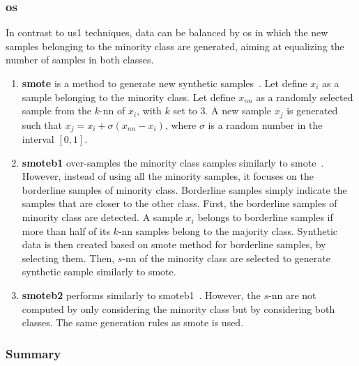 \subsubsection{\Acl*{os}}
In contrast to \ac{us1} techniques, data can be balanced by \ac{os} in which
the new samples belonging to the minority class are generated, aiming at
equalizing the number of samples in both classes.

\begin{enumerate}[leftmargin=*]

\item[] \textbf{\Ac{smote}} is a method to generate new synthetic
  samples~\cite{chawla2002smote}.
  Let define $x_i$ as a sample belonging to the minority class.
  Let define $x_{nn}$ as a randomly selected sample from the $k$-\ac{nn} of
  $x_i$, with $k$ set to 3.
  A new sample $x_j$ is generated such that $x_j = x_i + \sigma \left( x_{nn} -
    x_i \right)$, where $\sigma$ is a random number in the interval
  $\left[0,1\right]$.

\item[] \textbf{\Ac{smoteb1}} over-samples the minority class samples similarly to
  \ac{smote}~\cite{han2005borderline}.
  However, instead of using all the minority samples, it focuses on the
  borderline samples of minority class.
  Borderline samples simply indicate the samples that are closer to the other
  class.
  First, the borderline samples of minority class are detected.
  A sample $x_{i}$ belongs to borderline samples if more than half of its
  $k$-\ac{nn} samples belong to the majority class.
  Synthetic data is then created based on \ac{smote} method for borderline
  samples, by selecting them.
  Then, $s$-\ac{nn} of the minority class are selected to generate synthetic
  sample similarly to \ac{smote}.

\item[] \textbf{\Ac{smoteb2}} performs similarly to \ac{smoteb1}~\cite{han2005borderline}.
  However, the $s$-\ac{nn} are not computed by only considering the minority
  class but by considering both classes.
  The same generation rules as \ac{smote} is used.

\end{enumerate}

\subsubsection{Summary}


